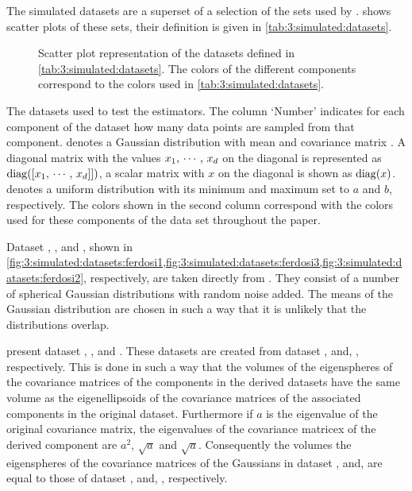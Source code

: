 
The simulated datasets are a superset of a selection of the sets used by \textcite{ferdosi2011comparison}.  shows scatter plots of these sets, their definition is given in \cref{tab:3:simulated:datasets}.

\begin{figure*}
	\centering
	
	\caption{Scatter plot representation of the datasets defined in \cref{tab:3:simulated:datasets}. The colors of the different components correspond to the colors used in \cref{tab:3:simulated:datasets}.}
	\label{fig:3:simulated:datasets}
\end{figure*}

\begin{table*}
	\centering
	
	\caption{The datasets used to test the estimators. The column `Number' indicates for each component of the dataset how many data points are sampled from that component. \gaussDist{\varMean}{\varCovarianceMatrix} denotes a Gaussian distribution with mean \varMean and covariance matrix \varCovarianceMatrix. A diagonal matrix with the values $x_1,\, \cdots,\, x_d$ on the diagonal is represented as $\operatorname{diag}([x_1,\,\cdots,\,x_d]])$, a scalar matrix with $x$ on the diagonal is shown as $\operatorname{diag}(x)$.  denotes a uniform distribution with its minimum and maximum set to $a$ and $b$, respectively. The colors shown in the second column correspond with the colors used for these components of the data set throughout the paper.} 	
	\label{tab:3:simulated:datasets}
\end{table*}

Dataset \ferdosiOne, \ferdosiTwo, and \ferdosiThree, shown in \cref{fig:3:simulated:datasets:ferdosi1,fig:3:simulated:datasets:ferdosi3,fig:3:simulated:datasets:ferdosi2}, respectively, are taken directly from \citeauthor{ferdosi2011comparison}. They consist of a number of spherical Gaussian distributions with random noise added. The means of the Gaussian distribution are chosen in such a way that it is unlikely that the distributions overlap.

 present dataset \baakmanOne, \baakmanTwo, and \baakmanThree. These datasets are created from dataset \ferdosiOne, \ferdosiTwo and, \ferdosiThree, respectively. This is done in such a way that the volumes of the eigenspheres of the covariance matrices of the components in the derived datasets have the same volume as the eigenellipsoids of the covariance matrices of the associated components in the original dataset. Furthermore if $a$ is the eigenvalue of the original covariance matrix, the eigenvalues of the covariance matricex of the derived component are $a^2$, $\sqrt{a}$ and $\sqrt{a}$. Consequently the volumes the eigenspheres of the covariance matrices of the Gaussians in dataset \baakmanOne, \baakmanTwo and, \baakmanThree are equal to those of dataset \ferdosiOne, \ferdosiTwo and, \ferdosiThree, respectively.

